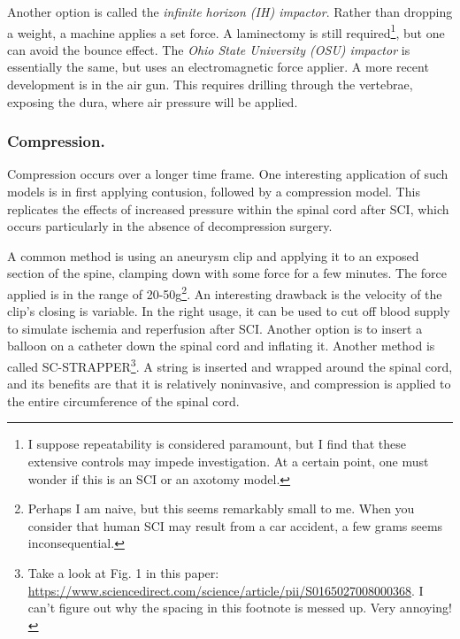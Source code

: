 \documentclass[12pt]{report}
\begin{document}
Another option is called the \textit{infinite horizon (IH) impactor}. Rather than dropping a weight, a machine applies a set force. A laminectomy is still required\footnote{I suppose repeatability is considered paramount, but I find that these extensive controls may impede investigation. At a certain point, one must wonder if this is an SCI or an axotomy model.}, but one can avoid the bounce effect. The \textit{Ohio State University (OSU) impactor} is essentially the same, but uses an electromagnetic force applier. A more recent development is in the air gun. This requires drilling through the vertebrae, exposing the dura, where air pressure will be applied. 


\subsubsection{Compression.}
Compression occurs over a longer time frame. One interesting application of such models is in first applying contusion, followed by a compression model. This replicates the effects of increased pressure within the spinal cord after SCI, which occurs particularly in the absence of decompression surgery.\newline

A common method is using an aneurysm clip and applying it to an exposed section of the spine, clamping down with some force for a few minutes. The force applied is in the range of 20-50g\footnote{Perhaps I am naive, but this seems remarkably small to me. When you consider that human SCI may result from a car accident, a few grams seems inconsequential.}. An interesting drawback is the velocity of the clip's closing is variable. In the right usage, it can be used to cut off blood supply to simulate ischemia and reperfusion after SCI. Another option is to insert a balloon on a catheter down the spinal cord and inflating it. Another method is called SC-STRAPPER\footnote{Take a look at Fig. 1 in this paper: \url{https://www.sciencedirect.com/science/article/pii/S0165027008000368}. I can't figure out why the spacing in this footnote is messed up. Very annoying!}. A string is inserted and wrapped around the spinal cord, and its benefits are that it is relatively noninvasive, and compression is applied to the entire circumference of the spinal cord. 
\end{document}
